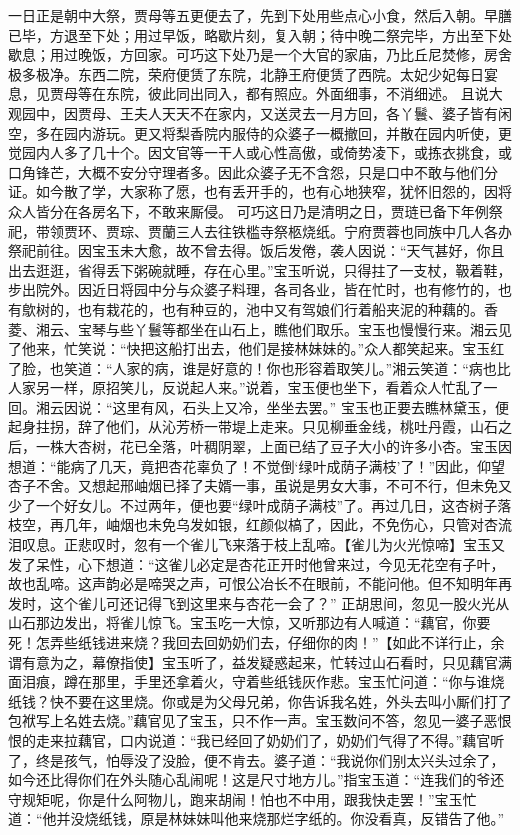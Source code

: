 \documentclass[12pt,oneside]{book}
\begin{document}
一日正是朝中大祭，贾母等五更便去了，先到下处用些点心小食，然后入朝。早膳已毕，方退至下处；用过早饭，略歇片刻，复入朝；待中晚二祭完毕，方出至下处歇息；用过晚饭，方回家。可巧这下处乃是一个大官的家庙，乃比丘尼焚修，房舍极多极净。东西二院，荣府便赁了东院，北静王府便赁了西院。太妃少妃每日宴息，见贾母等在东院，彼此同出同入，都有照应。外面细事，不消细述。
且说大观园中，因贾母、王夫人天天不在家内，又送灵去一月方回，各丫鬟、婆子皆有闲空，多在园内游玩。更又将梨香院内服侍的众婆子一概撤回，并散在园内听使，更觉园内人多了几十个。因文官等一干人或心性高傲，或倚势凌下，或拣衣挑食，或口角锋芒，大概不安分守理者多。因此众婆子无不含怨，只是口中不敢与他们分证。如今散了学，大家称了愿，也有丢开手的，也有心地狭窄，犹怀旧怨的，因将众人皆分在各房名下，不敢来厮侵。
可巧这日乃是清明之日，贾琏已备下年例祭祀，带领贾环、贾琮、贾蘭三人去往铁槛寺祭柩烧纸。宁府贾蓉也同族中几人各办祭祀前往。因宝玉未大愈，故不曾去得。饭后发倦，袭人因说：“天气甚好，你且出去逛逛，省得丢下粥碗就睡，存在心里。”宝玉听说，只得拄了一支杖，靸着鞋，步出院外。因近日将园中分与众婆子料理，各司各业，皆在忙时，也有修竹的，也有歍树的，也有栽花的，也有种豆的，池中又有驾娘们行着船夹泥的种藕的。香菱、湘云、宝琴与些丫鬟等都坐在山石上，瞧他们取乐。宝玉也慢慢行来。湘云见了他来，忙笑说：“快把这船打出去，他们是接林妹妹的。”众人都笑起来。宝玉红了脸，也笑道：“人家的病，谁是好意的！你也形容着取笑儿。”湘云笑道：“病也比人家另一样，原招笑儿，反说起人来。”说着，宝玉便也坐下，看着众人忙乱了一回。湘云因说：“这里有风，石头上又冷，坐坐去罢。”
宝玉也正要去瞧林黛玉，便起身拄拐，辞了他们，从沁芳桥一带堤上走来。只见柳垂金线，桃吐丹霞，山石之后，一株大杏树，花已全落，叶稠阴翠，上面已结了豆子大小的许多小杏。宝玉因想道：“能病了几天，竟把杏花辜负了！不觉倒‘绿叶成荫子满枝’了！”因此，仰望杏子不舍。又想起邢岫烟已择了夫婿一事，虽说是男女大事，不可不行，但未免又少了一个好女儿。不过两年，便也要“绿叶成荫子满枝”了。再过几日，这杏树子落枝空，再几年，岫烟也未免乌发如银，红颜似槁了，因此，不免伤心，只管对杏流泪叹息。正悲叹时，忽有一个雀儿飞来落于枝上乱啼。【雀儿为火光惊啼】宝玉又发了呆性，心下想道：“这雀儿必定是杏花正开时他曾来过，今见无花空有子叶，故也乱啼。这声韵必是啼哭之声，可恨公冶长不在眼前，不能问他。但不知明年再发时，这个雀儿可还记得飞到这里来与杏花一会了？”
正胡思间，忽见一股火光从山石那边发出，将雀儿惊飞。宝玉吃一大惊，又听那边有人喊道：“藕官，你要死！怎弄些纸钱进来烧？我回去回奶奶们去，仔细你的肉！”【如此不详行止，余谓有意为之，幕僚指使】宝玉听了，益发疑惑起来，忙转过山石看时，只见藕官满面泪痕，蹲在那里，手里还拿着火，守着些纸钱灰作悲。宝玉忙问道：“你与谁烧纸钱？快不要在这里烧。你或是为父母兄弟，你告诉我名姓，外头去叫小厮们打了包袱写上名姓去烧。”藕官见了宝玉，只不作一声。宝玉数问不答，忽见一婆子恶恨恨的走来拉藕官，口内说道：“我已经回了奶奶们了，奶奶们气得了不得。”藕官听了，终是孩气，怕辱没了没脸，便不肯去。婆子道：“我说你们别太兴头过余了，如今还比得你们在外头随心乱闹呢！这是尺寸地方儿。”指宝玉道：“连我们的爷还守规矩呢，你是什么阿物儿，跑来胡闹！怕也不中用，跟我快走罢！”宝玉忙道：“他并没烧纸钱，原是林妹妹叫他来烧那烂字纸的。你没看真，反错告了他。”
\end{document}

